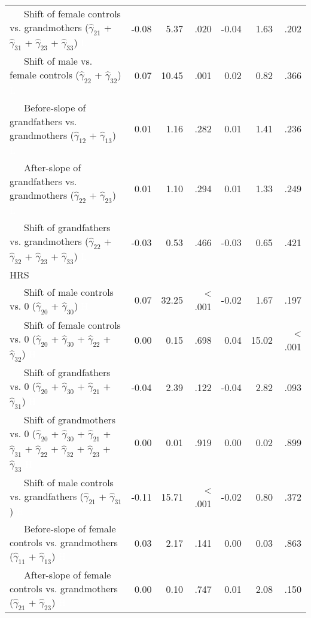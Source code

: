 \documentclass[
  english,
  man, noextraspace]{apa7}
\newenvironment{lltable}{\begin{landscape}\begin{center}\begin{ThreePartTable}}{\end{ThreePartTable}\end{center}\end{landscape}}
\begin{document}
\begin{appendix}
\begin{lltable}
{\begin{longtable}{lrrrrrr}
\ \ \ Shift of female controls vs. grandmothers 
($\hat{\gamma}_{21}$ + $\hat{\gamma}_{31}$ + 
$\hat{\gamma}_{23}$ + $\hat{\gamma}_{33}$) \textcolor{white}{L} & -0.08 & 5.37 & .020 & -0.04 & 1.63 & .202\\
\ \ \ Shift of male vs. female controls 
($\hat{\gamma}_{22}$ + $\hat{\gamma}_{32}$) \textcolor{white}{L} & 0.07 & 10.45 & .001 & 0.02 & 0.82 & .366\\
\ \ \ Before-slope of grandfathers vs. grandmothers 
($\hat{\gamma}_{12}$ + $\hat{\gamma}_{13}$) \textcolor{white}{L} & 0.01 & 1.16 & .282 & 0.01 & 1.41 & .236\\
\ \ \ After-slope of grandfathers vs. grandmothers 
($\hat{\gamma}_{22}$ + $\hat{\gamma}_{23}$) \textcolor{white}{L} & 0.01 & 1.10 & .294 & 0.01 & 1.33 & .249\\
\ \ \ Shift of grandfathers vs. grandmothers 
($\hat{\gamma}_{22}$ + $\hat{\gamma}_{32}$ + 
$\hat{\gamma}_{23}$ + $\hat{\gamma}_{33}$) \textcolor{white}{L} & -0.03 & 0.53 & .466 & -0.03 & 0.65 & .421\\
HRS &  &  &  &  &  & \\
\ \ \ Shift of male controls vs. 0 ($\hat{\gamma}_{20}$ + 
$\hat{\gamma}_{30}$) \textcolor{white}{H} & 0.07 & 32.25 & < .001 & -0.02 & 1.67 & .197\\
\ \ \ Shift of female controls vs. 0 ($\hat{\gamma}_{20}$ + 
$\hat{\gamma}_{30}$ + $\hat{\gamma}_{22}$ + 
$\hat{\gamma}_{32}$) \textcolor{white}{H} & 0.00 & 0.15 & .698 & 0.04 & 15.02 & < .001\\
\ \ \ Shift of grandfathers vs. 0 ($\hat{\gamma}_{20}$ + 
$\hat{\gamma}_{30}$ + $\hat{\gamma}_{21}$ + 
$\hat{\gamma}_{31}$) \textcolor{white}{H} & -0.04 & 2.39 & .122 & -0.04 & 2.82 & .093\\
\ \ \ Shift of grandmothers vs. 0 ($\hat{\gamma}_{20}$ + 
$\hat{\gamma}_{30}$ + $\hat{\gamma}_{21}$ + 
$\hat{\gamma}_{31}$ + $\hat{\gamma}_{22}$ + 
$\hat{\gamma}_{32}$ + $\hat{\gamma}_{23}$ +
$\hat{\gamma}_{33}$ \textcolor{white}{H} & 0.00 & 0.01 & .919 & 0.00 & 0.02 & .899\\
\ \ \ Shift of male controls vs. grandfathers 
($\hat{\gamma}_{21}$ + $\hat{\gamma}_{31}$) \textcolor{white}{H} & -0.11 & 15.71 & < .001 & -0.02 & 0.80 & .372\\
\ \ \ Before-slope of female controls vs. grandmothers 
($\hat{\gamma}_{11}$ + $\hat{\gamma}_{13}$) \textcolor{white}{H} & 0.03 & 2.17 & .141 & 0.00 & 0.03 & .863\\
\ \ \ After-slope of female controls vs. grandmothers 
($\hat{\gamma}_{21}$ + $\hat{\gamma}_{23}$) \textcolor{white}{H} & 0.00 & 0.10 & .747 & 0.01 & 2.08 & .150\\

\end{longtable}}
\end{lltable}
\end{appendix}
\end{document}
